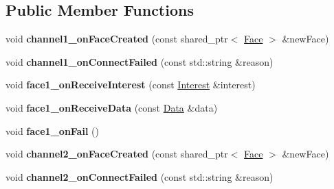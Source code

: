 \subsection*{Public Member Functions}
\begin{DoxyCompactItemize}
\item 
void {\bfseries channel1\+\_\+on\+Face\+Created} (const shared\+\_\+ptr$<$ \hyperlink{classnfd_1_1Face}{Face} $>$ \&new\+Face)\hypertarget{classnfd_1_1tests_1_1EndToEndFixture_aa51312b39e9aaad574ee3f39f1c060f7}{}\label{classnfd_1_1tests_1_1EndToEndFixture_aa51312b39e9aaad574ee3f39f1c060f7}

\item 
void {\bfseries channel1\+\_\+on\+Connect\+Failed} (const std\+::string \&reason)\hypertarget{classnfd_1_1tests_1_1EndToEndFixture_a2725607de7f07f5209aab60ea3663b71}{}\label{classnfd_1_1tests_1_1EndToEndFixture_a2725607de7f07f5209aab60ea3663b71}

\item 
void {\bfseries face1\+\_\+on\+Receive\+Interest} (const \hyperlink{classndn_1_1Interest}{Interest} \&interest)\hypertarget{classnfd_1_1tests_1_1EndToEndFixture_a8afa70f742630b0af44adeb83fd31a53}{}\label{classnfd_1_1tests_1_1EndToEndFixture_a8afa70f742630b0af44adeb83fd31a53}

\item 
void {\bfseries face1\+\_\+on\+Receive\+Data} (const \hyperlink{classndn_1_1Data}{Data} \&data)\hypertarget{classnfd_1_1tests_1_1EndToEndFixture_ae32fe6a8257936ef35344807b9aba662}{}\label{classnfd_1_1tests_1_1EndToEndFixture_ae32fe6a8257936ef35344807b9aba662}

\item 
void {\bfseries face1\+\_\+on\+Fail} ()\hypertarget{classnfd_1_1tests_1_1EndToEndFixture_a60bdccb906757aea1547eb85bcf6e89a}{}\label{classnfd_1_1tests_1_1EndToEndFixture_a60bdccb906757aea1547eb85bcf6e89a}

\item 
void {\bfseries channel2\+\_\+on\+Face\+Created} (const shared\+\_\+ptr$<$ \hyperlink{classnfd_1_1Face}{Face} $>$ \&new\+Face)\hypertarget{classnfd_1_1tests_1_1EndToEndFixture_a7823b42f5183e8e2b57c2d2325a68eac}{}\label{classnfd_1_1tests_1_1EndToEndFixture_a7823b42f5183e8e2b57c2d2325a68eac}

\item 
void {\bfseries channel2\+\_\+on\+Connect\+Failed} (const std\+::string \&reason)\hypertarget{classnfd_1_1tests_1_1EndToEndFixture_ac67b134ad9979919bd4c35f99de06077}{}\label{classnfd_1_1tests_1_1EndToEndFixture_ac67b134ad9979919bd4c35f99de06077}


\end{DoxyCompactItemize}
